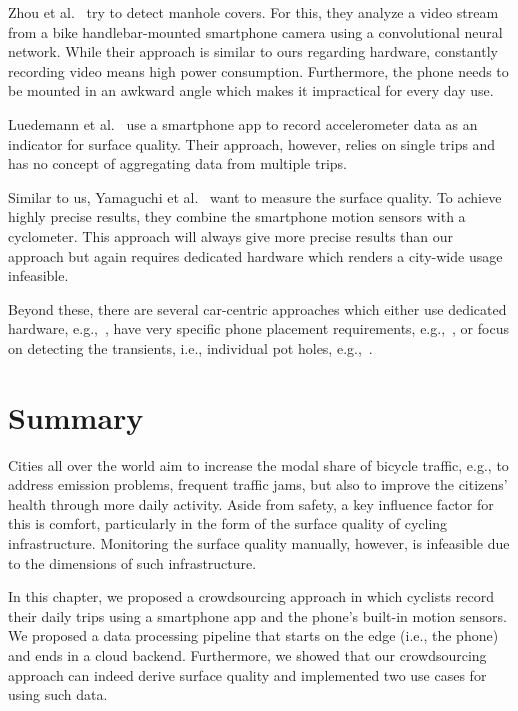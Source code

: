 Zhou et al.~\cite{zhou2022smartphone} try to detect manhole covers.
For this, they analyze a video stream from a bike handlebar-mounted smartphone camera using a convolutional neural network.
While their approach is similar to ours regarding hardware, constantly recording video means high power consumption.
Furthermore, the phone needs to be mounted in an awkward angle which makes it impractical for every day use.

Luedemann et al.~\cite{luedemann2022bikevibes} use a smartphone app to record accelerometer data as an indicator for surface quality.
Their approach, however, relies on single trips and has no concept of aggregating data from multiple trips.

Similar to us, Yamaguchi et al.~\cite{yamaguchi2015simple} want to measure the surface quality.
To achieve highly precise results, they combine the smartphone motion sensors with a cyclometer.
This approach will always give more precise results than our approach but again requires dedicated hardware which renders a city-wide usage infeasible.

Beyond these, there are several car-centric approaches which either use dedicated hardware, e.g.,~\cite{chen2013crsm}, have very specific phone placement requirements, e.g.,~\cite{daraghmi2020crowdsourcing}, or focus on detecting the transients, i.e., individual pot holes, e.g.,~\cite{alam2020crowdsourcing,li2014crowdsourcing,lima2016using}.


\section{Summary}
\label{sec:summary_cyclequality}
Cities all over the world aim to increase the modal share of bicycle traffic, e.g., to address emission problems, frequent traffic jams, but also to improve the citizens' health through more daily activity.
Aside from safety, a key influence factor for this is comfort, particularly in the form of the surface quality of cycling infrastructure.
Monitoring the surface quality manually, however, is infeasible due to the dimensions of such infrastructure.

In this chapter, we proposed a crowdsourcing approach in which cyclists record their daily trips using a smartphone app and the phone's built-in motion sensors.
We proposed a data processing pipeline that starts on the edge (i.e., the phone) and ends in a cloud backend.
Furthermore, we showed that our crowdsourcing approach can indeed derive surface quality and implemented two use cases for using such data.



